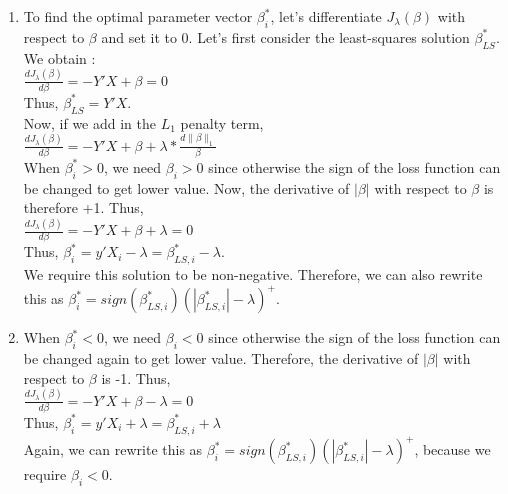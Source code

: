 \begin{enumerate}
{\begin{enumerate}
	\item{
	To find the optimal parameter vector $\beta_{i}^{*}$, let's differentiate $J_{\lambda}(\beta)$ with respect to $\beta$	 and set it to 0. Let's first consider the least-squares solution $\beta_{LS}^{*}$. We obtain :\\

	$\frac{d J_{\lambda}(\beta)}{d \beta} = -Y'X + \beta = 0 $ \\ 
	
	Thus, $\beta_{LS}^{*} = Y'X $.\\ 
	
	Now, if we add in the $L_{1}$ penalty term,\\
	
	$\frac{d J_{\lambda}(\beta)}{d \beta} = -Y'X + \beta + \lambda * \frac{d  \| \beta \|_{1}}{\beta}$ \\
	
	When  $\beta_{i}^{*} > 0$, we need $\beta_{i} > 0$ since otherwise the sign of the loss function can be changed to get lower value. Now, the derivative of $|\beta|$ with respect to $\beta$ is therefore +1. Thus,\\
	
	$\frac{d J_{\lambda}(\beta)}{d \beta} = -Y'X + \beta + \lambda = 0$\\
	
	Thus, $\beta_{i}^{*} = y'X_{i} - \lambda = \beta_{LS,i}^{*} - \lambda$.\\
	
	We require this solution to be non-negative. Therefore, we can also  rewrite this as  $\beta_{i}^{*} = sign(\beta_{LS,i}^{*})(|\beta_{LS,i}^{*}| - \lambda)^{+}$.\\
	}	
	
	\item{	
	When  $\beta_{i}^{*} < 0$, we need $\beta_{i} < 0$ since otherwise the sign of the loss function can be changed again to get lower value. Therefore, the derivative of $|\beta|$ with respect to $\beta$ is -1. Thus,\\
	
	$\frac{d J_{\lambda}(\beta)}{d \beta} = -Y'X + \beta - \lambda = 0$\\
	
	Thus, $\beta_{i}^{*} = y'X_{i} + \lambda = \beta_{LS,i}^{*} + \lambda$\\
	
	Again, we can rewrite this as  $\beta_{i}^{*} = sign(\beta_{LS,i}^{*})(|\beta_{LS,i}^{*}| - \lambda)^{+}$, because we require $\beta_{i} < 0$. \\					
	}
	

\end{enumerate}}
\end{enumerate}
